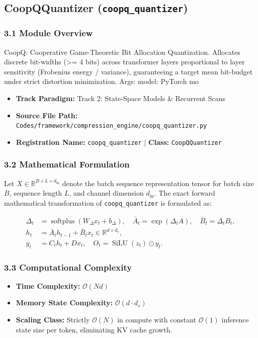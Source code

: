 \subsection{CoopQQuantizer (\texttt{coopq\_quantizer})}
\label{sec:app_module_coopq\_quantizer}

\subsubsection*{3.1 Module Overview}
CoopQ: Cooperative Game-Theoretic Bit Allocation Quantization. Allocates discrete bit-widths (>= 4 bits) across transformer layers proportional to layer sensitivity (Frobenius energy / variance), guaranteeing a target mean bit-budget under strict distortion minimization.  Args:     model: PyTorch mo
\begin{itemize}
    \item \textbf{Track Paradigm:} Track 2: State-Space Models & Recurrent Scans
    \item \textbf{Source File Path:} \texttt{Codes/framework/compression\_engine/coopq\_quantizer.py}
    \item \textbf{Registration Name:} \texttt{coopq\_quantizer} $\mid$ \textbf{Class:} \texttt{CoopQQuantizer}
\end{itemize}

\subsubsection*{3.2 Mathematical Formulation}
Let $X \in \mathbb{R}^{B \times L \times d_{\text{in}}}$ denote the batch sequence representation tensor for batch size $B$, sequence length $L$, and channel dimension $d_{\text{in}}$. The exact forward mathematical transformation of \texttt{coopq\_quantizer} is formulated as:

\begin{align}
\Delta_t &= \operatorname{softplus}(W_\Delta x_t + b_\Delta), \quad \bar{A}_t = \exp(\Delta_t A), \quad \bar{B}_t = \Delta_t B_t, \\
h_t &= \bar{A}_t h_{t-1} + \bar{B}_t x_t \in \mathbb{R}^{d \times d_s}, \\
y_t &= C_t h_t + D x_t, \quad O_t = \operatorname{SiLU}(z_t) \odot y_t.
\end{align}


\subsubsection*{3.3 Computational Complexity}
\begin{itemize}
    \item \textbf{Time Complexity:} $\mathcal{O}(N d)$
    \item \textbf{Memory State Complexity:} $\mathcal{O}(d \cdot d_s)$
    \item \textbf{Scaling Class:} Strictly $\mathcal{O}(N)$ in compute with constant $\mathcal{O}(1)$ inference state size per token, eliminating KV cache growth.
\end{itemize}

